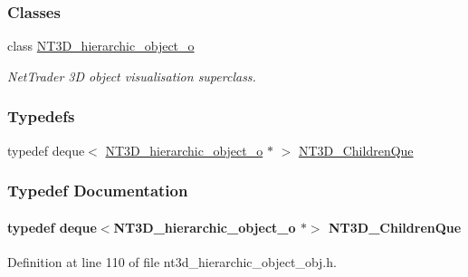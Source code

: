 \subsubsection*{Classes}
\begin{DoxyCompactItemize}
\item 
class \hyperlink{class_n_t3_d__hierarchic__object__o}{NT3D\_\-hierarchic\_\-object\_\-o}
\begin{DoxyCompactList}\small\item\em NetTrader 3D object visualisation superclass. \item\end{DoxyCompactList}\end{DoxyCompactItemize}
\subsubsection*{Typedefs}
\begin{DoxyCompactItemize}
\item 
typedef deque$<$ \hyperlink{class_n_t3_d__hierarchic__object__o}{NT3D\_\-hierarchic\_\-object\_\-o} $\ast$ $>$ \hyperlink{nt3d__hierarchic__object__obj_8h_a78ebd1647afa55c64ce090077c20169a}{NT3D\_\-ChildrenQue}
\end{DoxyCompactItemize}


\subsubsection{Typedef Documentation}
\paragraph[{NT3D\_\-ChildrenQue}]{\setlength{\rightskip}{0pt plus 5cm}typedef deque$<${\bf NT3D\_\-hierarchic\_\-object\_\-o} $\ast$$>$ {\bf NT3D\_\-ChildrenQue}}\hfill\label{nt3d__hierarchic__object__obj_8h_a78ebd1647afa55c64ce090077c20169a}


Definition at line 110 of file nt3d\_\-hierarchic\_\-object\_\-obj.h.

